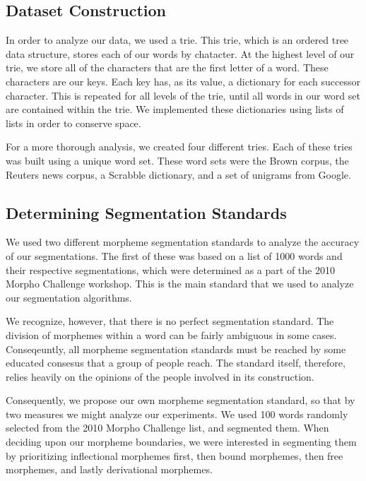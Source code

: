 \documentclass[11pt,letterpaper]{article}
\begin{document}
\subsection{Dataset Construction}
In order to analyze our data, we used a trie. This trie, which is an ordered tree data structure, stores each of our words by chatacter. At the highest level of our trie, we store all of the characters that are the first letter of a word. These characters are our keys. Each key has, as its value, a dictionary for each successor character. This is repeated for all levels of the trie, until all words in our word set are contained within the trie. We implemented these dictionaries using lists of lists in order to conserve space.

For a more thorough analysis, we created four different tries. Each of these tries was built using a unique word set. These word sets were the Brown corpus, the Reuters news corpus, a Scrabble dictionary, and a set of unigrams from Google. \par

\subsection{Determining Segmentation Standards}
We used two different morpheme segmentation standards to analyze the accuracy of our segmentations. The first of these was based on a list of 1000 words and their respective segmentations, which were determined as a part of the 2010 Morpho Challenge workshop. This is the main standard that we used to analyze our segmentation algorithms. \par

We recognize, however, that there is no perfect segmentation standard. The division of morphemes within a word can be fairly ambiguous in some cases. Conseqeuntly, all morpheme segmentation standards must be reached by some educated consesus that a group of people reach. The standard itself, therefore, relies heavily on the opinions of the people involved in its construction. \par

Consequently, we propose our own morpheme segmentation standard, so that by two measures we might analyze our experiments. We used 100 words randomly selected from the 2010 Morpho Challenge list, and segmented them. When deciding upon our morpheme boundaries, we were interested in segmenting them by prioritizing inflectional morphemes first, then bound morphemes, then free morphemes, and lastly derivational morphemes. \par
\end{document}
